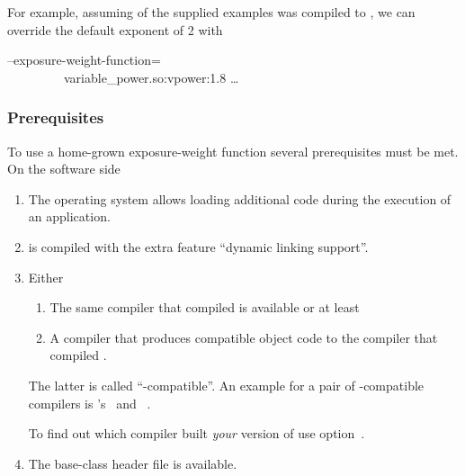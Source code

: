 \begin{itemize}
  For example, assuming  of the supplied examples was compiled to
  , we can override the default exponent of 2 with

  \begin{literal}
    \app{} --exposure-weight-function=\bslash \\
    ~~~~~~~~~variable\_power.so:vpower:1.8 \dots
  \end{literal}
\end{itemize}


\subsubsection[Prerequisites]{\label{sec:prerequisites}%
  Prerequisites}

To use a home-grown exposure-weight function several prerequisites must be met.  On the software
side

\begin{enumerate}
\item
  The operating system allows loading additional code during the execution of an application.

\item
  \App{} is compiled with the extra feature ``dynamic linking support''.

\item
  Either

  \begin{enumerate}
  \item
    The same compiler that compiled \App{} is available or at least

  \item
    A compiler that produces compatible object code to the compiler that compiled \App{}.
  \end{enumerate}

  The latter is called ``-compatible''.  An example for a pair of
  -compatible compilers is 's~ and
  ~.

  To find out which compiler built \emph{your} version of \appcmd{} use
  option~.

\item
  The base-class header file  is available.
\end{enumerate}

